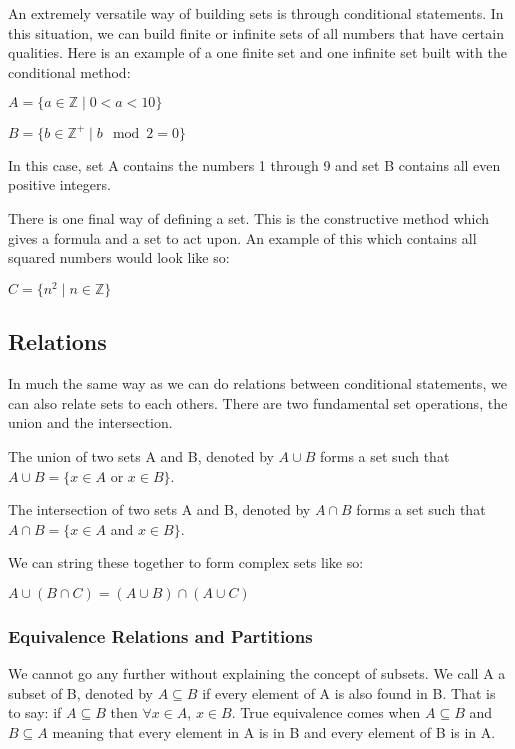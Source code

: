 An extremely versatile way of building sets is through conditional statements. In this situation, we can build finite or infinite sets of all numbers that have certain qualities. Here is an example of a one finite set and one infinite set built with the conditional method: 

\begin{example}
\begin{center}
$A = \{ a \in \mathbb{Z} \mid 0 < a < 10\}$
\end{center}
\begin{center}
$B = \{ b \in \mathbb{Z}^+ \mid b \mod 2 = 0\}$
\end{center}
\end{example}

In this case, set A contains the numbers 1 through 9 and set B contains all even positive integers. \newline

There is one final way of defining a set. This is the constructive method which gives a formula and a set to act upon. An example of this which contains all squared numbers would look like so:
\begin{center}
$C = \{ n^2 \mid n \in \mathbb{Z}\}$
\end{center}

\subsection{Relations}
In much the same way as we can do relations between conditional statements, we can also relate sets to each others.
There are two fundamental set operations, the union and the intersection.\newline

The union of two sets A and B, denoted by $A \cup B$ forms a set such that $A \cup B = \{x \in A$ or $x \in B\}$.\newline

The intersection of two sets A and B, denoted by $A \cap B$ forms a set such that $A \cap B = \{x \in A$ and $x \in B\}$.\newline

We can string these together to form complex sets like so:

\begin{center}
$A \cup (B \cap C) = (A \cup B) \cap (A \cup C)$
\end{center} 

\subsubsection{Equivalence Relations and Partitions}
We cannot go any further without explaining the concept of subsets.
We call A a subset of B, denoted by $A \subseteq B$ if every element of A is also found in B. \newline
That is to say: if $A \subseteq B$ then $\forall x \in A$, $x \in B$. True equivalence comes when $A \subseteq B$ and $B \subseteq A$ meaning that every element in A is in B and every element of B is in A. \newline

